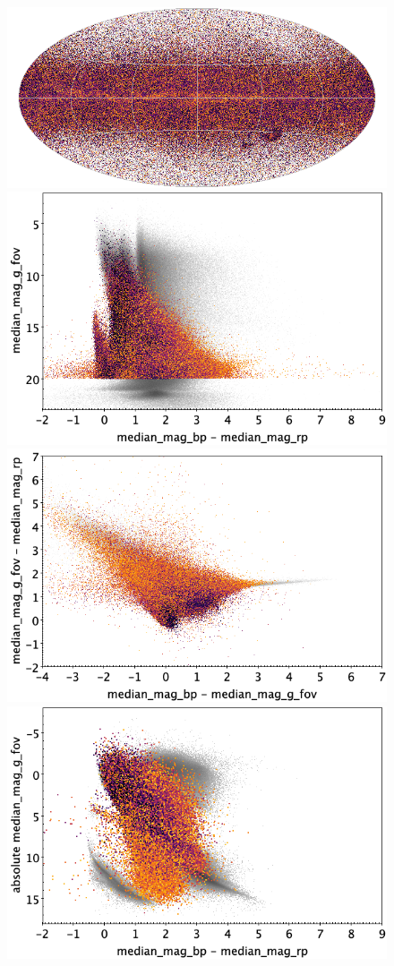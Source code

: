 \documentclass[longauth]{aa}
\begin{document}
\begin{appendix}
\begin{figure}
\centering
{}
\includegraphics[width=0.6\hsize]{figures/appendix/ECL_cls_sky.png} 
 \\ %
\vspace{4mm}
 \includegraphics[width=0.45\hsize]{figures/appendix/ECL_cls_cm.png}  %
\hspace{2mm}
 \includegraphics[width=0.45\hsize]{figures/appendix/ECL_cls_cc.png} \\ %
\vspace{4mm}
 \includegraphics[width=0.45\hsize]{figures/appendix/ECL_cls_cam.png}  %

\end{figure}
\end{appendix}
\end{document}
